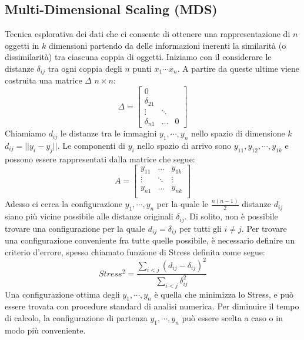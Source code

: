 \documentclass[11pt,a4paper,twocolumn]{article}
\begin{document}
\subsection{Multi-Dimensional Scaling (MDS)}
Tecnica esplorativa dei dati che ci consente di ottenere una rappresentazione di $n$ oggetti in $k$ dimensioni partendo da delle informazioni inerenti la similarità (o dissimilarità) tra  ciascuna coppia di oggetti. Iniziamo con il considerare le distanze $ \delta_{ij} $ tra ogni coppia degli $n$ punti $x_1 \cdots x_n$. A partire da queste ultime viene  costruita una matrice $\Delta$ $n \times n$:
\begin{equation}
\nonumber
\Delta=\begin{bmatrix}
0 \\
\delta_{21} &&\\
\vdots & \ddots\\
\delta_{n1} &   \dots     & 0
\end{bmatrix}
\end{equation}
Chiamiamo $d_{ij}$ le distanze tra le immagini $ y_{1},\cdots,y_{n}$ nello spazio di dimensione $k$ $d_{ij}=\lvert\lvert{y_i-y_j}\lvert\lvert$. Le componenti di $y_i$ nello spazio di arrivo sono $y_{11},y_{12},\cdots,y_{1k}$ e possono essere rappresentati dalla matrice che segue:
\begin{equation}
\nonumber
A = \begin{bmatrix}
y_{11}           & \dots         & y_{1k}         \\
\vdots   &  \ddots    & \vdots \\
y_{n1}          & \dots         & y_{nk}         \\
\end{bmatrix}
\end{equation}
Adesso ci cerca la configurazione $y_{1},\cdots,y_{n}$ per la quale le $\frac{n(n-1)}{2}$ distanze $d_{ij}$ siano più vicine possibile alle distanze originali $\delta_{ij}$. Di solito, non è possibile trovare una configurazione per la quale $d_{ij} = \delta_{ij}$ per tutti gli $i \neq j$. Per trovare una configurazione conveniente fra tutte quelle possibile, è necessario definire un criterio d'errore, spesso chiamato funzione di Stress definita come segue:
\begin{equation}
\nonumber
Stress^2=\frac{\sum_{i<j}{(d_{ij}-\delta_{ij})^2}}{\sum_{i<j}{\delta_{ij}^2}}
\end{equation}
Una configurazione ottima degli $y_1,\cdots,y_n$ è quella che minimizza lo Stress, e può essere trovata con  procedure standard di analisi numerica. Per diminuire il tempo di calcolo, la configurazione di partenza $y_1,\cdots,y_n$ può essere scelta a caso o in  modo più conveniente.
\end{document}
